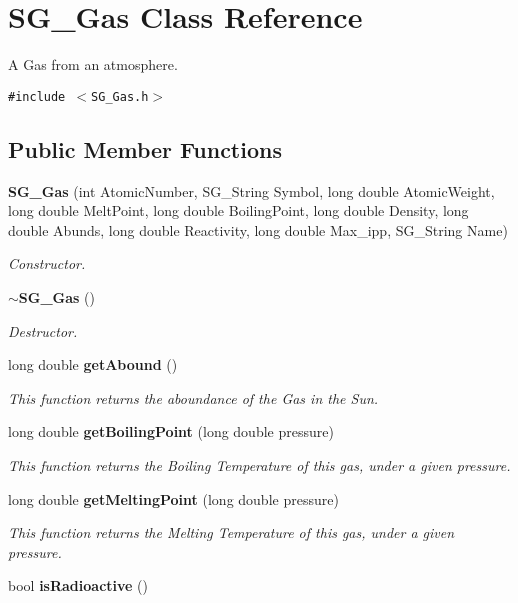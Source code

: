 \section{SG\_\-Gas Class Reference}
\label{class_s_g___gas}
A Gas from an atmosphere.  


{\tt \#include $<$SG\_\-Gas.h$>$}

\subsection*{Public Member Functions}
\begin{CompactItemize}
\item 
{\bf SG\_\-Gas} (int Atomic\-Number, SG\_\-String Symbol, long double Atomic\-Weight, long double Melt\-Point, long double Boiling\-Point, long double Density, long double Abunds, long double Reactivity, long double Max\_\-ipp, SG\_\-String Name)
\begin{CompactList}\small\item\em Constructor. \item\end{CompactList}\item 
{\bf $\sim$SG\_\-Gas} ()\label{class_s_g___gas_a1}

\begin{CompactList}\small\item\em Destructor. \item\end{CompactList}\item 
long double {\bf get\-Abound} ()
\begin{CompactList}\small\item\em This function returns the aboundance of the Gas in the Sun. \item\end{CompactList}\item 
long double {\bf get\-Boiling\-Point} (long double pressure)
\begin{CompactList}\small\item\em This function returns the Boiling Temperature of this gas, under a given pressure. \item\end{CompactList}\item 
long double {\bf get\-Melting\-Point} (long double pressure)
\begin{CompactList}\small\item\em This function returns the Melting Temperature of this gas, under a given pressure. \item\end{CompactList}\item 
bool {\bf is\-Radioactive} ()\label{class_s_g___gas_a5}


\end{CompactItemize}
